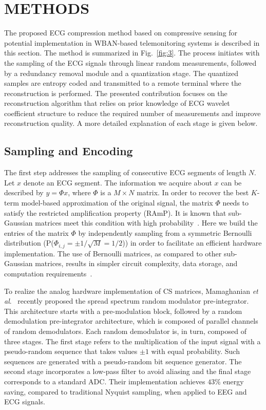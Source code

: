 \documentclass[journal]{IEEEtran}
\begin{document}
\section{METHODS}
\label{ssec:CSPKSSS}
The proposed ECG compression method based on compressive sensing for potential implementation in WBAN-based telemonitoring systems is described in this section. The method is summarized in Fig.~\ref{fig:3}. The process initiates with the sampling of the ECG signals through linear random measurements, followed by a redundancy removal module and a quantization stage. The quantized samples are entropy coded and transmitted to a remote terminal where the reconstruction is performed. The presented contribution focuses on the reconstruction algorithm that relies on prior knowledge of ECG wavelet coefficient structure to reduce the required number of measurements and improve reconstruction quality. A more detailed explanation of each stage is given below.

\subsection{Sampling and Encoding}
The first step addresses the sampling of consecutive ECG segments of length $N$. Let $x$ denote an ECG segment. The information we acquire about $x$ can be described by $y=\Phi x$, where $\Phi$ is a $M \times N$ matrix. In order to recover the best $K$-term model-based approximation of the original signal, the matrix $\Phi$ needs to satisfy the restricted amplification property (RAmP). It is known that sub-Gaussian matrices meet this condition with high probability~\cite{Bara10}. Here we build the entries of the matrix $\Phi$ by independently sampling from a symmetric Bernoulli distribution (P($\Phi_{i,j}=\pm1/\sqrt{M}=1/2$)) in order to facilitate an efficient hardware implementation. The use of Bernoulli matrices, as compared to other sub-Gaussian matrices, results in simpler circuit complexity, data storage, and computation requirements~\cite{Chen12}.

To realize the analog hardware implementation of CS matrices, Mamaghanian \textit{et al}.~\cite{Mama12} recently proposed the spread spectrum random modulator pre-integrator. This architecture starts with a pre-modulation block, followed by a random demodulation pre-integrator architecture, which is composed of parallel channels of random demodulators. Each random demodulator is, in turn, composed of three stages. The first stage refers to the multiplication of the input signal with a pseudo-random sequence that takes values $\pm1$ with equal probability. Such sequences are generated with a pseudo-random bit sequence generator. The second stage incorporates a low-pass filter to avoid aliasing and the final stage corresponds to a standard ADC. Their implementation achieves $43\%$ energy saving, compared to traditional Nyquist sampling, when applied to EEG and ECG signals.
\end{document}
